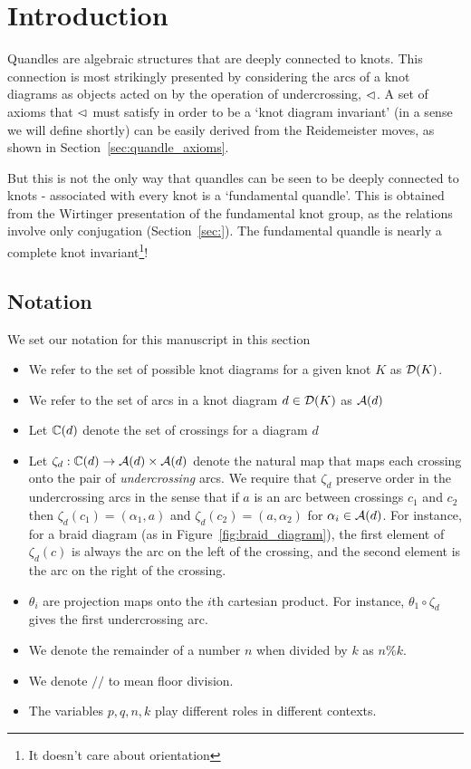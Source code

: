 \documentclass[paper.tex]{subfiles}
\begin{document}
\section{Introduction}
\label{sec:intro}

Quandles are algebraic structures that are deeply connected to knots. This connection is most strikingly presented by considering the arcs of a knot diagrams as objects acted on by the operation of
undercrossing, $\vartriangleleft$. A set of axioms that $\vartriangleleft$ must satisfy in order to be a `knot diagram invariant' (in a sense we will define shortly) can be easily derived from the Reidemeister moves, as shown in
Section~\ref{sec:quandle_axioms}.

But this is not the only way that quandles can be seen to be deeply connected to knots - associated with every knot is a `fundamental quandle'. This is obtained from the Wirtinger presentation of the fundamental knot group,
as the relations involve only conjugation (Section~\ref{sec:}). The fundamental quandle is nearly a complete knot invariant\footnote{It doesn't care about orientation}!


\subsection{Notation}

We set our notation for this manuscript in this section

\begin{itemize}
  \item We refer to the set of possible knot diagrams for a given knot $K$ as $\operatorname{\mathcal{D}}(K)$.
  \item We refer to the set of arcs in a knot diagram $d \in \operatorname{\mathcal{D}}(K)$ as $\mathcal{A}(d)$
  \item Let $\mathbb{C}(d)$ denote the set of crossings for a diagram $d$
  \item Let $\zeta_d: \mathbb{C}(d) \to \mathcal{A}(d) \times \mathcal{A}(d)$ denote the natural map that maps each crossing onto the pair of
    \emph{undercrossing} arcs. We require that $\zeta_d$ preserve order in the undercrossing arcs in the
    sense that if $a$ is an arc between crossings $c_1$ and $c_2$ then $\zeta_d(c_1) = (\alpha_1, a)$ and $\zeta_d(c_2) = (a, \alpha_2)$ for
    $\alpha_i \in \mathcal{A}(d)$. For instance, for a braid diagram (as in Figure~\ref{fig:braid_diagram}), the first element of $\zeta_d(c)$ is always the arc on the left of the crossing,
    and the second element is the arc on the right of the crossing.
  \item $\theta_i$ are projection maps onto the $i$th cartesian product. For instance, $\theta_1 \circ \zeta_d$ gives the first undercrossing arc.
  \item We denote the remainder of a number $n$ when divided by $k$ as $n\%k$.
  \item We denote $//$ to mean floor division.
  \item The variables $p,q,n,k$ play different roles in different contexts.
\end{itemize}
\end{document}
